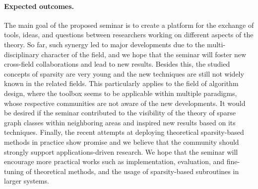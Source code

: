 \paragraph*{Expected outcomes.}
The main goal of the proposed seminar is to create a platform for the exchange of tools, ideas, and questions between researchers working on different aspects of the theory.
So far, such synergy led to major developments due to the multi-disciplinary character of the field, and we hope that the seminar will foster new cross-field collaborations and lead to new results.
Besides this, the studied concepts of sparsity are very young and the new techniques are still not widely known in the related fields. 
This particularly applies to the field of algorithm design, where the toolbox seems to be applicable within multiple paradigms, whose respective communities are not aware of the new developments.
It would be desired if the seminar contributed to the visibility of the theory of sparse graph classes within neighboring areas and inspired new results based on its techniques.
Finally, the recent attempts at deploying theoretical sparsity-based methods in practice show promise and we believe that the community should strongly support applications-driven research.
We hope that the seminar will encourage more practical works such as implementation, evaluation, and fine-tuning of theoretical methods, and the usage of sparsity-based subroutines in larger systems.
